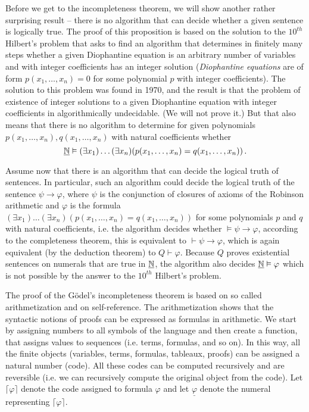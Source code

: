 Before we get to the incompleteness theorem, we will show another rather surprising result -- there is no algorithm that can decide whether a given sentence is logically true. The proof of this proposition is based on the solution to the $10^{th}$ Hilbert's problem that asks to find an algorithm that determines in finitely many steps whether a given Diophantine equation is an arbitrary number of variables and with integer coefficients has an integer solution (\emph{Diophantine equations} are of form $p(x_1, \dots, x_n) = 0$ for some polynomial $p$ with integer coefficients). The solution to this problem was found in 1970, and the result is that the problem of existence of integer solutions to a given Diophantine equation with integer coefficients in algorithmically undecidable. (We will not prove it.) But that also means that there is no algorithm to determine for given polynomials $p(x_1, \dots, x_n), q(x_1, \dots, x_n)$ with natural coefficients whether $$\underline{\mathbb{N}} \vDash (\exists x_1)\dots(\exists x_n)(p(x_1, \dots, x_n) = q(x_1, \dots, x_n))\,.$$

Assume now that there is an algorithm that can decide the logical truth of sentences. In particular, such an algorithm could decide the logical truth of the sentence $\psi \to \varphi$, where $\psi$ is the conjunction of closures of axioms of the Robinson arithmetic and $\varphi$ is the formula $(\exists x_1)\dots(\exists x_n)(p(x_1, \dots, x_n) = q(x_1, \dots, x_n))$ for some polynomials $p$ and $q$ with natural coefficients, i.e. the algorithm decides whether $\vDash \psi \to \varphi$, according to the completeness theorem, this is equivalent to $\vdash \psi \to \varphi$, which is again equivalent (by the deduction theorem) to $Q \vdash \varphi$. Because $Q$ proves existential sentences on numerals that are true in $\underline{\mathbb{N}}$, the algorithm also decides $\underline{\mathbb{N}} \vDash \varphi$ which is not possible by the answer to the $10^{th}$ Hilbert's problem.

The proof of the Gödel's incompleteness theorem is based on so called arithmetization and on self-reference. The arithmetization shows that the syntactic notions of proofs can be expressed as formulas in arithmetic. We start by assigning numbers to all symbols of the language and then create a function, that assigns values to sequences (i.e. terms, formulas, and so on). In this way, all the finite objects (variables, terms, formulas, tableaux, proofs) can be assigned a natural number (code). All these codes can be computed recursively and are reversible (i.e. we can recursively compute the original object from the code). Let $\lceil \varphi \rceil$ denote the code assigned to formula $\varphi$ and let $\underline{\varphi}$ denote the numeral representing $\lceil \varphi \rceil$.

